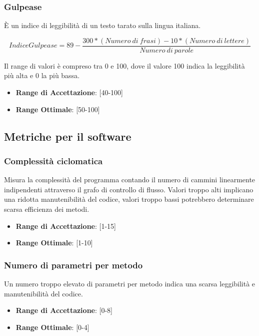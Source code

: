 \documentclass[12pt,a4paper]{article}
\begin{document}
\subsubsection{Gulpease}
È un indice di leggibilità di un testo tarato sulla lingua italiana.

\[IndiceGulpease=89-\frac{300*(Numero\ di\ frasi)-10*(Numero\ di\ lettere)}{Numero\ di\ parole}\]

Il range di valori è compreso tra 0 e 100, dove il valore 100 indica la leggibilità più alta e 0 la più bassa.

\begin{itemize}
\item \textbf{Range di Accettazione}: [40-100]
\item \textbf{Range Ottimale}: [50-100]
\end{itemize}

\subsection{Metriche per il software}\label{metriche_sw}

\subsubsection{Complessità ciclomatica}
Misura la complessità del programma contando il numero di cammini linearmente indipendenti attraverso il grafo di controllo di flusso. Valori troppo alti implicano una ridotta manutenibilità del codice, valori troppo bassi potrebbero determinare scarsa efficienza dei metodi.

\begin{itemize}
\item \textbf{Range di Accettazione}: [1-15]
\item \textbf{Range Ottimale}: [1-10]
\end{itemize}

\subsubsection{Numero di parametri per metodo}
Un numero troppo elevato di parametri per metodo indica una scarsa leggibilità e manutenibilità del codice.

\begin{itemize}
\item \textbf{Range di Accettazione}: [0-8]
\item \textbf{Range Ottimale}: [0-4]
\end{itemize}
\end{document}
